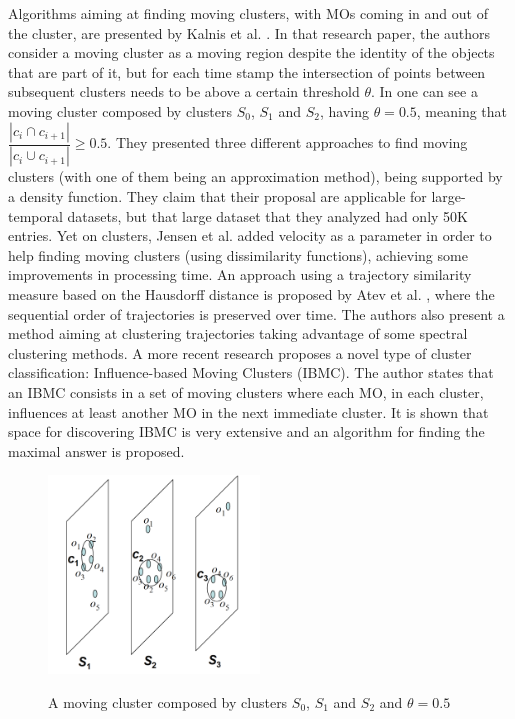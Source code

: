 Algorithms aiming at finding moving clusters, with MOs coming in and out of the cluster, are presented by Kalnis et al.
\citep{movingclusters}. In that research paper, the authors consider a moving cluster as a moving region despite the
identity of the objects that are part of it, but for each time stamp the intersection of points between subsequent
clusters needs to be above a certain threshold $\theta$. In  one can see a moving cluster composed
by clusters $S_0$, $S_1$ and $S_2$, having $\theta=0.5$, meaning that $\dfrac{|c_i \cap c_{i+1}|}{|c_i \cup c_{i+1}|}
\geq 0.5$. They presented three different approaches to find moving clusters (with one of them being an approximation
method), being supported by a density function. They claim that their proposal are applicable for large-temporal
datasets, but that large dataset that they analyzed had only 50K entries. Yet on clusters, Jensen et al.
\citep{clusters3} added velocity as a parameter in order to help finding moving clusters (using dissimilarity
functions), achieving some improvements in processing time. An approach using a trajectory similarity measure based on
the Hausdorff distance is proposed by Atev et al. \citep{clusters2}, where the sequential order of trajectories is
preserved over time. The authors also present a method aiming at clustering trajectories taking advantage of some
spectral clustering methods. A more recent research \citep{clusters1} proposes a novel type of cluster classification:
Influence-based Moving Clusters (IBMC). The author states that an IBMC consists in a set of moving clusters where each
MO, in each cluster, influences at least another MO in the next immediate cluster. It is shown that space for
discovering IBMC is very extensive and an algorithm for finding the maximal answer is proposed.

\begin{figure}
    \centering
    \caption{A moving cluster composed by clusters $S_0$, $S_1$ and $S_2$ and $\theta=0.5$ \citep{movingclusters}}
    \includegraphics[width=0.5\textwidth]{images/clusters.png}
    \label{fig:clusters}
\end{figure}

